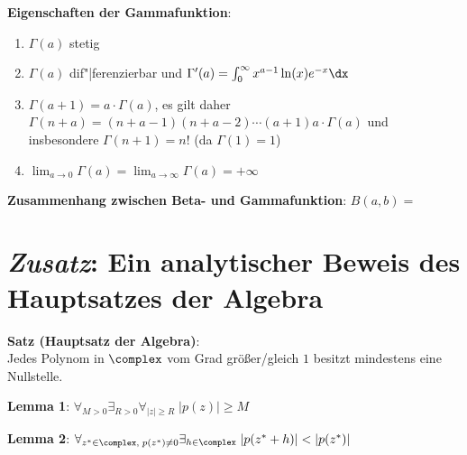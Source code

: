 \textbf{Eigenschaften der Gammafunktion}:
\begin{enumerate}
    \item
    $\Gamma(a)$ stetig

    \item
    $\Gamma(a)$ dif"|ferenzierbar und
    $\Gamma'(a) = \int_0^\infty x^{a-1} \ln(x) e^{-x} \dx$

    \item
    $\Gamma(a + 1) = a \cdot \Gamma(a)$, es gilt daher
    $\Gamma(n + a) = (n + a - 1) (n + a - 2) \dotsm (a + 1) a \cdot \Gamma(a)$
    und insbesondere $\Gamma(n + 1) = n!$
    (da $\Gamma(1) = 1$)

    \item
    $\lim_{a \to 0} \Gamma(a) = \lim_{a \to \infty} \Gamma(a) = +\infty$
\end{enumerate}

\linie

\textbf{Zusammenhang zwischen Beta- und Gammafunktion}:
$B(a, b) =$ 

\section{%
    \emph{Zusatz}: Ein analytischer Beweis des Hauptsatzes der Algebra%
}

\textbf{Satz (Hauptsatz der Algebra)}: \\
Jedes Polynom in $\complex$ vom Grad größer/gleich $1$ besitzt mindestens
eine Nullstelle.

\textbf{Lemma 1}:
$\forall_{M > 0} \exists_{R > 0} \forall_{|z| \ge R}\; |p(z)| \ge M$

\textbf{Lemma 2}:
$\forall_{z^\ast \in \complex,\; p(z^\ast) \not= 0} \exists_{h \in \complex}\;
|p(z^\ast + h)| < |p(z^\ast)|$

\pagebreak
